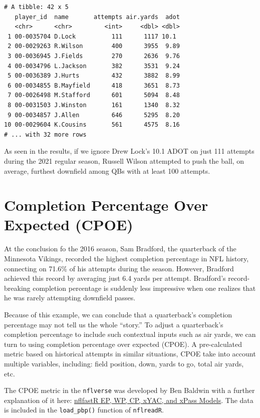 \documentclass[
  letterpaper,
]{krantz}
\begin{document}
\begin{verbatim}
# A tibble: 42 x 5
   player_id  name       attempts air.yards  adot
   <chr>      <chr>         <int>     <dbl> <dbl>
 1 00-0035704 D.Lock          111      1117 10.1 
 2 00-0029263 R.Wilson        400      3955  9.89
 3 00-0036945 J.Fields        270      2636  9.76
 4 00-0034796 L.Jackson       382      3531  9.24
 5 00-0036389 J.Hurts         432      3882  8.99
 6 00-0034855 B.Mayfield      418      3651  8.73
 7 00-0026498 M.Stafford      601      5094  8.48
 8 00-0031503 J.Winston       161      1340  8.32
 9 00-0034857 J.Allen         646      5295  8.20
10 00-0029604 K.Cousins       561      4575  8.16
# ... with 32 more rows
\end{verbatim}

As seen in the results, if we ignore Drew Lock's 10.1 ADOT on just 111
attempts during the 2021 regular season, Russell Wilson attempted to
push the ball, on average, furthest downfield among QBs with at least
100 attempts.

\hypertarget{completion-percentage-over-expected-cpoe}{%
\section{Completion Percentage Over Expected
(CPOE)}\label{completion-percentage-over-expected-cpoe}}

At the conclusion fo the 2016 season, Sam Bradford, the quarterback of
the Minnesota Vikings, recorded the highest completion percentage in NFL
history, connecting on 71.6\% of his attempts during the season.
However, Bradford achieved this record by averaging just 6.4 yards per
attempt. Bradford's record-breaking completion percentage is suddenly
less impressive when one realizes that he was rarely attempting
downfield passes.

Because of this example, we can conclude that a quarterback's completion
percentage may not tell us the whole ``story.'' To adjust a
quarterback's completion percentage to include such contextual inputs
such as air yards, we can turn to using completion percentage over
expected (CPOE). A pre-calculated metric based on historical attempts in
similar situations, CPOE take into account multiple variables,
including: field position, down, yards to go, total air yards, etc.

The CPOE metric in the \texttt{nflverse} was developed by Ben Baldwin
with a further explanation of it here:
\href{https://www.opensourcefootball.com/posts/2020-09-28-nflfastr-ep-wp-and-cp-models/}{nflfastR
EP, WP, CP, xYAC, and xPass Models}. The data is included in the
\texttt{load\_pbp()} function of \texttt{nflreadR}.
\end{document}
